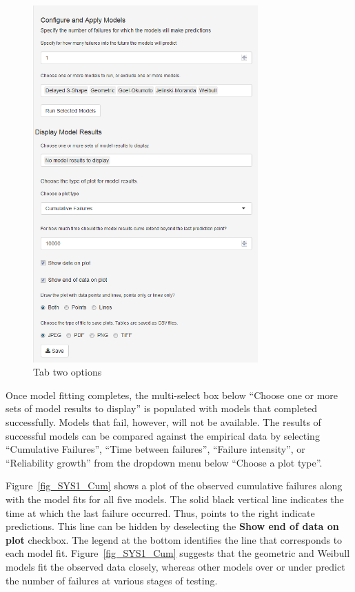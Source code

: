 \documentclass[journal]{IEEEtran}
\begin{document}
\begin{figure}[!h]
\centering%
\includegraphics[width=3.4in]{Figures/Fig8}
\caption{Tab two options}
\label{fig_Tab2}
\end{figure}

Once model fitting completes, the multi-select box below ``Choose one or more sets of model results to display'' is populated with models that completed successfully. Models that fail, however, will not be available. The results of successful models can be compared against the empirical data by selecting ``Cumulative Failures'', ``Time between failures'', ``Failure intensity'', or ``Reliability growth'' from the dropdown menu below ``Choose a plot type''.

Figure~\ref{fig_SYS1_Cum} shows a plot of the observed cumulative failures along with the model fits for all five models. The solid black vertical line indicates the time at which the last failure occurred. Thus, points to the right indicate predictions. This line can be hidden by deselecting the \textbf{Show end of data on plot} checkbox. The legend at the bottom identifies the line that corresponds to each model fit. Figure~\ref{fig_SYS1_Cum} suggests that the geometric and Weibull models fit the observed data closely, whereas other models over or under predict the number of failures at various stages of testing.
\end{document}
